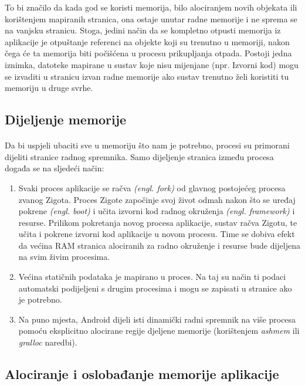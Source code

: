 \documentclass[times, utf8, zavrsni]{fer}
\begin{document}
To bi značilo da kada god se koristi memorija, bilo alociranjem novih objekata ili korištenjem mapiranih stranica, ona ostaje unutar radne memorije i ne sprema se na vanjsku stranicu. Stoga, jedini način da se kompletno otpusti memorija iz aplikacije je otpuštanje referenci na objekte koji su trenutno u memoriji, nakon čega će ta memorija biti počišćena u procesu prikupljanja otpada. Postoji jedna iznimka, datoteke mapirane u sustav koje nisu mijenjane (npr. Izvorni kod) mogu se izvaditi u stranicu izvan radne memorije ako sustav trenutno želi koristiti tu memoriju u druge svrhe.

\subsection{Dijeljenje memorije}
\paragraph{}
Da bi uspjeli ubaciti sve u memoriju što nam je potrebno, procesi su primorani dijeliti stranice radnog spremnika. Samo dijeljenje stranica između procesa događa se na sljedeći način:

\begin{enumerate}
\item
Svaki proces aplikacije se račva \textit{(engl. fork)} od glavnog postojećeg procesa zvanog Zigota. Proces Zigote započinje svoj život odmah nakon što se uređaj pokrene \textit{(engl. boot)} i učita izvorni kod radnog okruženja \textit{(engl. framework)} i resurse. Prilikom pokretanja novog procesa aplikacije, sustav račva Zigotu, te učita i pokrene izvorni kod aplikacije u novom procesu. Time se dobiva efekt da većina RAM stranica alociranih za radno okruženje i resurse bude dijeljena na svim živim procesima.

\item
Većina statičnih podataka je mapirano u proces. Na taj su način ti podaci automatski podijeljeni s drugim procesima i mogu se zapisati u stranice ako je potrebno.

\item
Na puno mjesta, Android dijeli isti dinamički radni spremnik na više procesa pomoću eksplicitno alocirane regije djeljene memorije (korištenjem \textit{ashmem} ili \textit{gralloc} naredbi).
\end{enumerate}

\subsection{Alociranje i oslobađanje memorije aplikacije}
\end{document}
